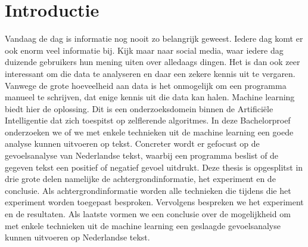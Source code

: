 \chapter{Introductie}\label{introductie}
Vandaag de dag is informatie nog nooit zo belangrijk geweest. Iedere dag komt er ook enorm veel informatie bij. Kijk maar naar social media, waar iedere dag duizende gebruikers hun mening uiten over alledaags dingen. Het is dan ook zeer interessant om die data te analyseren en daar een zekere kennis uit te vergaren. Vanwege de grote hoeveelheid aan data is het onmogelijk om een programma manueel te schrijven, dat enige kennis uit die data kan halen. Machine learning biedt hier de oplossing. Dit is een onderzoeksdomein binnen de Artifici\"ele Intelligentie dat zich toespitst op zelflerende algoritmes. In deze Bachelorproef onderzoeken we of we met enkele technieken uit de machine learning een goede analyse kunnen uitvoeren op tekst. Concreter wordt er gefocust op de gevoelsanalyse van Nederlandse tekst, waarbij een programma beslist of de gegeven tekst een positief of negatief gevoel uitdrukt.
Deze thesis is opgesplitst in drie grote delen namelijke de achtergrondinformatie, het experiment en de conclusie. Als achtergrondinformatie worden alle technieken die tijdens die het experiment worden toegepast besproken. Vervolgens bespreken we het experiment en de resultaten. Als laatste vormen we een conclusie over de mogelijkheid om met enkele technieken uit de machine learning een geslaagde gevoelsanalyse kunnen uitvoeren op Nederlandse tekst.  
